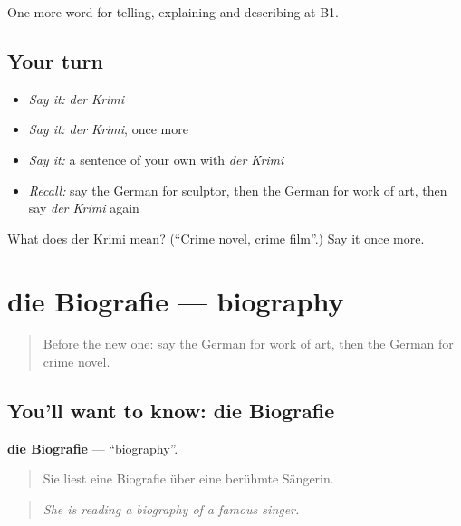 \begin{grammarlens}[title={What you've built}]
One more word for telling, explaining and describing at B1.
\end{grammarlens}

\subsection*{Your turn}
\begin{itemize}
\raggedright
  \item \emph{Say it:} \emph{der Krimi}
  \item \emph{Say it:} \emph{der Krimi}, once more
  \item \emph{Say it:} a sentence of your own with \emph{der Krimi}
  \item \emph{Recall:} say the German for sculptor, then the German for work of art, then say \emph{der Krimi} again
\end{itemize}

\begin{tcolorbox}[breakable,colback=teal!4,colframe=teal!35!black,title={Before you move on}]
What does der Krimi mean? (\textquotedblleft{}Crime novel, crime film\textquotedblright{}.) Say it once more.
\end{tcolorbox}
\section[die Biografie]{die Biografie — biography}

\label{lesson:GE-C520-biografie}



\begin{quote}
Before the new one: say the German for work of art, then the German for crime novel.
\end{quote}

\subsection*{You'll want to know: die Biografie}
\textbf{die Biografie} — \textquotedblleft{}biography\textquotedblright{}.

\begin{quote}
Sie liest eine Biografie über eine berühmte Sängerin.
\end{quote}

\begin{quote}
\emph{She is reading a biography of a famous singer.}
\end{quote}


